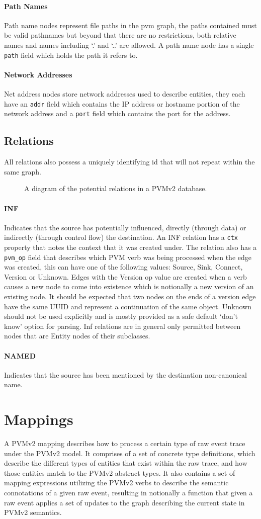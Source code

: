 \documentclass[12pt,twoside,a4paper]{article}
\newcommand{\field}[1]{\texttt{#1}}
\newcommand{\para}[1]{\paragraph{#1\\}}
\begin{document}
\para{Path Names}
\label{sec:gs:node:name:path}
Path name nodes represent file paths in the pvm graph, the paths contained must be valid pathnames but beyond that there are no restrictions, both relative names and names including `.' and `..' are allowed. A path name node has a single \field{path} field which holds the path it refers to.

\para{Network Addresses}
\label{sec:gs:node:name:net}
Net address nodes store network addresses used to describe entities, they each have an \field{addr} field which contains the IP address or hostname portion of the network address and a \field{port} field which contains the port for the address.

\subsection{Relations}
\label{sec:gs:rel}
All relations also possess a uniquely identifying id that will not repeat within the same graph.

\begin{figure}[h]
\centering

\caption{A diagram of the potential relations in a PVMv2 database.}
\label{fig:rels}
\end{figure}

\para{INF}
\label{sec:gs:rel:inf}
Indicates that the source has potentially influenced, directly (through data) or indirectly (through control flow) the destination. An INF relation has a \field{ctx} property that notes the context that it was created under. The relation also has a \field{pvm\_op} field that describes which PVM verb was being processed when the edge was created, this can have one of the following values: Source, Sink, Connect, Version or Unknown. Edges with the Version op value are created when a verb causes a new node to come into existence which is notionally a new version of an existing node. It should be expected that two nodes on the ends of a version edge have the same UUID and represent a continuation of the same object. Unknown should not be used explicitly and is mostly provided as a safe default `don't know' option for parsing. Inf relations are in general only permitted between nodes that are Entity nodes of their subclasses. %

\para{NAMED}
\label{sec:gs:rel:named}
Indicates that the source has been mentioned by the destination non-canonical name.

\section{Mappings}
\label{sec:map}
A PVMv2 mapping describes how to process a certain type of raw event trace under the PVMv2 model. It comprises of a set of concrete type definitions, which describe the different types of entities that exist within the raw trace, and how those entities match to the PVMv2 abstract types. It also contains a set of mapping expressions utilizing the PVMv2 verbs to describe the semantic connotations of a given raw event, resulting in notionally a function that given a raw event applies a set of updates to the graph describing the current state in PVMv2 semantics.
\end{document}
